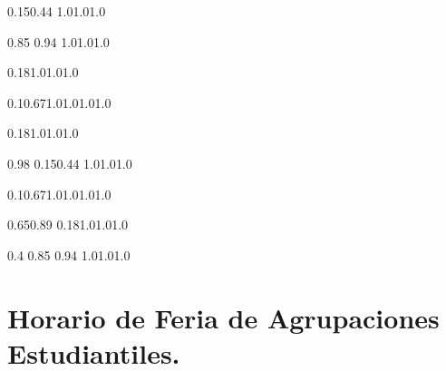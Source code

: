 \documentclass[a4paper,11pt]{article}                 %
\begin{document}
 \begin{landscape}
 
 \setslotsize{2.8cm}{0.25cm}
 \settextframe{1.0mm}
 
 
  {0.15}{0.44} {1.0}{1.0}{1.0}
 
   {0.85} {0.94} {1.0}{1.0}{1.0}
 
  {0.18}{1.0}{1.0}{1.0}

 
 
 
 
   {0.1}{0.67}{1.0}{1.0}{1.0}{1.0}   
 
  {0.18}{1.0}{1.0}{1.0}

 
   {0.98} {0.15}{0.44} {1.0}{1.0}{1.0}
  
 
 
   {0.1}{0.67}{1.0}{1.0}{1.0}{1.0}   
 
        {0.65}{0.89} {0.18}{1.0}{1.0}{1.0}

 {0.4} {0.85} {0.94} {1.0}{1.0}{1.0}
 
  
 
\section*{Horario de Feria de Agrupaciones Estudiantiles.}
 \begin{timetable}
 

\end{timetable}
\end{landscape}
\end{document}
